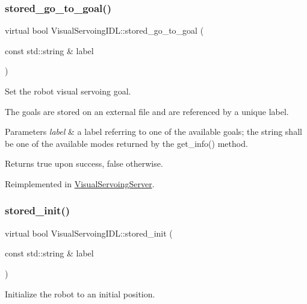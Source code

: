 \subsubsection{\texorpdfstring{stored\+\_\+go\+\_\+to\+\_\+goal()}{stored\_go\_to\_goal()}}
{\footnotesize\ttfamily virtual bool Visual\+Servoing\+I\+D\+L\+::stored\+\_\+go\+\_\+to\+\_\+goal (\begin{DoxyParamCaption}\item[{const std\+::string \&}]{label }\end{DoxyParamCaption})\hspace{0.3cm}{\ttfamily [virtual]}}



Set the robot visual servoing goal. 

The goals are stored on an external file and are referenced by a unique label. 
\begin{DoxyParams}{Parameters}
{\em label} & a label referring to one of the available goals; the string shall be one of the available modes returned by the get\+\_\+info() method. \\
\hline
\end{DoxyParams}
\begin{DoxyReturn}{Returns}
true upon success, false otherwise. 
\end{DoxyReturn}


Reimplemented in \hyperlink{classVisualServoingServer_a1c5018056e6a7db492cc6b1418f8d1e5}{Visual\+Servoing\+Server}.

\mbox{\label{classVisualServoingIDL_a20ff1561b87126c9b852eacd5ea59d26}} 
\subsubsection{\texorpdfstring{stored\+\_\+init()}{stored\_init()}}
{\footnotesize\ttfamily virtual bool Visual\+Servoing\+I\+D\+L\+::stored\+\_\+init (\begin{DoxyParamCaption}\item[{const std\+::string \&}]{label }\end{DoxyParamCaption})\hspace{0.3cm}{\ttfamily [virtual]}}



Initialize the robot to an initial position. 

